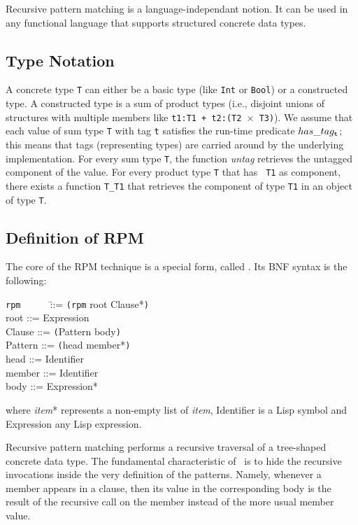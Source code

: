 \begin{sloppypar}
Recursive pattern matching is a language-independant notion. It can be
used in any functional language that supports structured concrete data
types. 

\subsection{Type Notation}

A concrete type {\tt T} can either be a basic type (like {\tt Int} or
{\tt Bool}) or a constructed type. A constructed type is a sum of
product types (i.e., disjoint unions of structures with multiple
members like {\tt t1:T1 + t2:(T2 $\times$ T3)}). We assume that each
value of sum type {\tt T} with tag {\tt t} satisfies the run-time
predicate $has\_tag_{\tt t}$; this means that tags (representing
types) are carried around by the underlying implementation. For every
sum type {\tt T}, the function {\em untag} retrieves the untagged
component of the value.  For every product type {\tt T} that has {\tt
T1} as component, there exists a function {\tt T\_T1} that retrieves
the component of type {\tt T1} in an object of type {\tt T}.

\subsection{Definition of RPM}

The core of the RPM technique is a special form, called \rpm. Its
BNF syntax is the following:
\begin{tabbing}
{\tt rpm}~~~~~~\=::= {\tt (rpm} root Clause*{\tt )} \\
root    \>::= Expression \\
Clause  \>::= {\tt (}Pattern body{\tt  )} \\
Pattern \>::= {\tt (}head member*{\tt )} \\
head    \>::= Identifier \\
member  \>::= Identifier \\
body    \>::= Expression*
\end{tabbing}
where {\em item}* represents a non-empty list of {\em item},
Identifier is a Lisp symbol and Expression any Lisp expression.

Recursive pattern matching performs a recursive traversal of a
tree-shaped concrete data type. The fundamental characteristic of
\rpm\ is to hide the recursive invocations inside the very definition
of the patterns. Namely, whenever a member appears in a clause, then
its value in the corresponding body is the result of the recursive
call on the member instead of the more usual member value.


\end{sloppypar}
